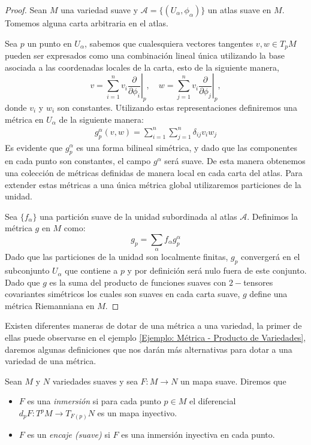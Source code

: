 \begin{proof}
	Sean $M$ una variedad suave y $\mathcal{A} = \{(U_{\alpha},\phi_{\alpha})\}$ un atlas suave en $M$. Tomemos alguna carta arbitraria en el atlas.

	Sea $p$ un punto en $U_{\alpha}$, sabemos que cualesquiera vectores tangentes $v, w \in T_{p}M$ pueden ser expresados como una combinación lineal única utilizando la base asociada a las coordenadas locales de la carta, esto de la siguiente manera,
	\[
		v = \sum_{i=1}^{n} \left. v_{i}\frac{\partial}{\partial \phi_{i}} \right|_{p},
		\quad
		w = \sum_{j=1}^{n} \left. v_{i}\frac{\partial}{\partial \phi_{j}} \right|_{p},
	\]
	donde $v_{i}$ y $w_{i}$ son constantes. Utilizando estas representaciones definiremos una métrica en $U_{\alpha}$ de la siguiente manera:
	\begin{align*}
		g^{\alpha}_{p} (v,w) = \sum_{i=1}^{n}\sum_{j=1}^{n} \delta_{ij} v_{i}w_{j}
	\end{align*}
	Es evidente que $g^{\alpha}_{p}$ es una forma bilineal simétrica, y dado que las componentes en cada punto son constantes, el campo $g^{\alpha}$ será suave. De esta manera obtenemos una colección de métricas definidas de manera local en cada carta del atlas. Para extender estas métricas a una única métrica global utilizaremos particiones de la unidad.

	Sea $\{f_{\alpha}\}$ una partición suave de la unidad subordinada al atlas $\mathcal{A}$. Definimos la métrica $g$ en $M$ como:
	\[
		g_{p} = \sum_{\alpha}f_{\alpha}g_{p}^{\alpha}
	\]
	Dado que las particiones de la unidad son localmente finitas, $g_{p}$ convergerá en el subconjunto $U_{\alpha}$ que contiene a $p$ y por definición será nulo fuera de este conjunto. Dado que $g$ es la suma del producto de funciones suaves con $2-$tensores covariantes simétricos los cuales son suaves en cada carta suave, $g$ define una métrica Riemanniana en $M$.
\end{proof}

Existen diferentes maneras de dotar de una métrica a una variedad, la primer de ellas puede observarse en el ejemplo \ref{Ejemplo: Métrica - Producto de Variedades}, daremos algunas definiciones que nos darán más alternativas para dotar a una variedad de una métrica.

\begin{definition}
	Sean $M$ y $N$ variedades suaves y sea $F: M \to N$ un mapa suave. Diremos que
	\begin{itemize}
		\item $F$ es una \textit{inmersión} si para cada punto $p \in M$ el diferencial $d_{p}F: T^{p}M \to T_{F(p)}N$ es un mapa inyectivo.
		\item $F$ es un \textit{encaje (suave)} si $F$ es una inmersión inyectiva en cada punto.
	\end{itemize}
\end{definition}

